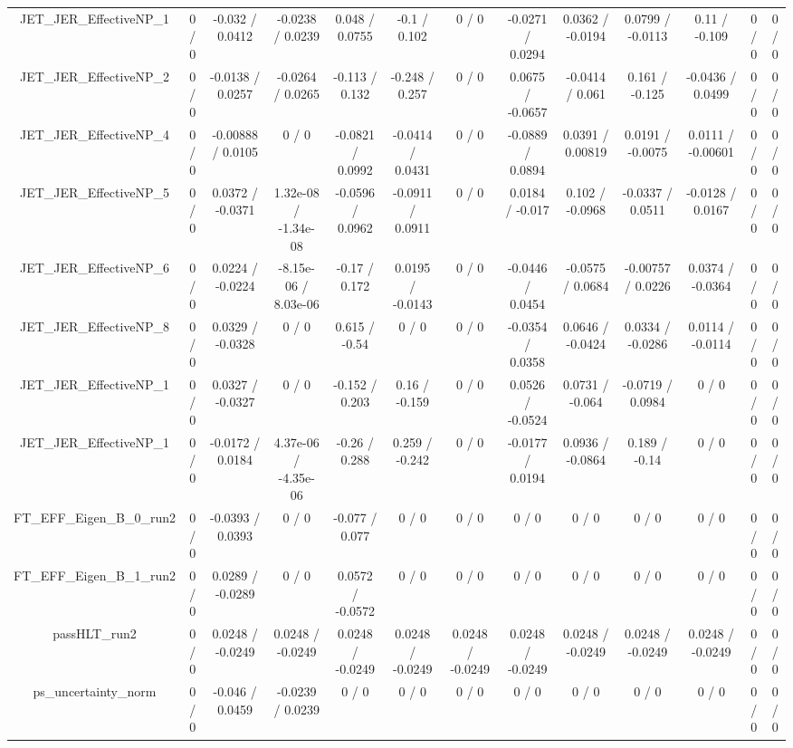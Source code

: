 \documentclass[10pt]{article}
\begin{document}
\begin{table}[htbp]
\begin{center}
\begin{tabular}{|c|c|c|c|c|c|c|c|c|c|c|c|c|}
  JET_JER_EffectiveNP_1 & 0 / 0 & -0.032 / 0.0412 & -0.0238 / 0.0239 & 0.048 / 0.0755 & -0.1 / 0.102 & 0 / 0 & -0.0271 / 0.0294 & 0.0362 / -0.0194 & 0.0799 / -0.0113 & 0.11 / -0.109 & 0 / 0 & 0 / 0 \\ 
  JET_JER_EffectiveNP_2 & 0 / 0 & -0.0138 / 0.0257 & -0.0264 / 0.0265 & -0.113 / 0.132 & -0.248 / 0.257 & 0 / 0 & 0.0675 / -0.0657 & -0.0414 / 0.061 & 0.161 / -0.125 & -0.0436 / 0.0499 & 0 / 0 & 0 / 0 \\ 
  JET_JER_EffectiveNP_4 & 0 / 0 & -0.00888 / 0.0105 & 0 / 0 & -0.0821 / 0.0992 & -0.0414 / 0.0431 & 0 / 0 & -0.0889 / 0.0894 & 0.0391 / 0.00819 & 0.0191 / -0.0075 & 0.0111 / -0.00601 & 0 / 0 & 0 / 0 \\ 
  JET_JER_EffectiveNP_5 & 0 / 0 & 0.0372 / -0.0371 & 1.32e-08 / -1.34e-08 & -0.0596 / 0.0962 & -0.0911 / 0.0911 & 0 / 0 & 0.0184 / -0.017 & 0.102 / -0.0968 & -0.0337 / 0.0511 & -0.0128 / 0.0167 & 0 / 0 & 0 / 0 \\ 
  JET_JER_EffectiveNP_6 & 0 / 0 & 0.0224 / -0.0224 & -8.15e-06 / 8.03e-06 & -0.17 / 0.172 & 0.0195 / -0.0143 & 0 / 0 & -0.0446 / 0.0454 & -0.0575 / 0.0684 & -0.00757 / 0.0226 & 0.0374 / -0.0364 & 0 / 0 & 0 / 0 \\ 
  JET_JER_EffectiveNP_8 & 0 / 0 & 0.0329 / -0.0328 & 0 / 0 & 0.615 / -0.54 & 0 / 0 & 0 / 0 & -0.0354 / 0.0358 & 0.0646 / -0.0424 & 0.0334 / -0.0286 & 0.0114 / -0.0114 & 0 / 0 & 0 / 0 \\ 
  JET_JER_EffectiveNP_1 & 0 / 0 & 0.0327 / -0.0327 & 0 / 0 & -0.152 / 0.203 & 0.16 / -0.159 & 0 / 0 & 0.0526 / -0.0524 & 0.0731 / -0.064 & -0.0719 / 0.0984 & 0 / 0 & 0 / 0 & 0 / 0 \\ 
  JET_JER_EffectiveNP_1 & 0 / 0 & -0.0172 / 0.0184 & 4.37e-06 / -4.35e-06 & -0.26 / 0.288 & 0.259 / -0.242 & 0 / 0 & -0.0177 / 0.0194 & 0.0936 / -0.0864 & 0.189 / -0.14 & 0 / 0 & 0 / 0 & 0 / 0 \\ 
  FT_EFF_Eigen_B_0_run2 & 0 / 0 & -0.0393 / 0.0393 & 0 / 0 & -0.077 / 0.077 & 0 / 0 & 0 / 0 & 0 / 0 & 0 / 0 & 0 / 0 & 0 / 0 & 0 / 0 & 0 / 0 \\ 
  FT_EFF_Eigen_B_1_run2 & 0 / 0 & 0.0289 / -0.0289 & 0 / 0 & 0.0572 / -0.0572 & 0 / 0 & 0 / 0 & 0 / 0 & 0 / 0 & 0 / 0 & 0 / 0 & 0 / 0 & 0 / 0 \\ 
  passHLT_run2 & 0 / 0 & 0.0248 / -0.0249 & 0.0248 / -0.0249 & 0.0248 / -0.0249 & 0.0248 / -0.0249 & 0.0248 / -0.0249 & 0.0248 / -0.0249 & 0.0248 / -0.0249 & 0.0248 / -0.0249 & 0.0248 / -0.0249 & 0 / 0 & 0 / 0 \\ 
  ps_uncertainty_norm & 0 / 0 & -0.046 / 0.0459 & -0.0239 / 0.0239 & 0 / 0 & 0 / 0 & 0 / 0 & 0 / 0 & 0 / 0 & 0 / 0 & 0 / 0 & 0 / 0 & 0 / 0 \\ 

\end{tabular}
\end{center}
\end{table}
\end{document}
